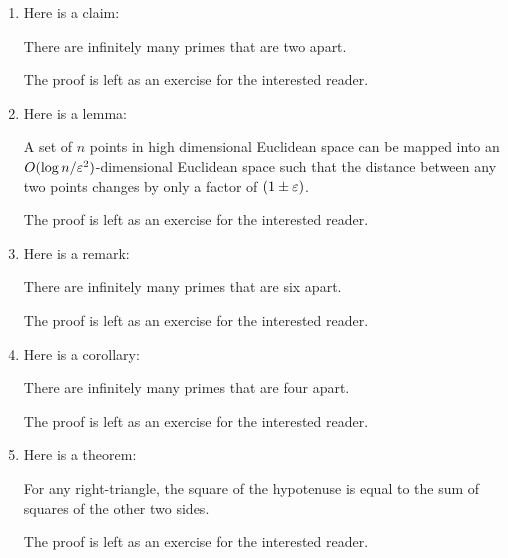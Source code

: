\documentclass{article}
\begin{document}
\fontin
{}
\begin{enumerate}
  [
    leftmargin={*},
    label={\arabic*.},
    font={\bf\fontin},
    labelsep={10pt},
    itemsep={20pt},
    ref={\arabic*}
  ]
  \item \label{qst:1}
    Here is a claim:
    \begin{claim}\label{clm:1}
      There are infinitely many primes that are two apart.
    \end{claim}
    \begin{proof*}
      The proof is left as an exercise for the interested reader.
    \end{proof*}

  \item \label{qst:2}
    Here is a lemma:
    \begin{lemma}\label{lma:1}
      A set of $n$ points in high dimensional Euclidean space can
      be mapped into an $O(\log n/\varepsilon^2)$-dimensional Euclidean
      space such that the distance between any two points changes
      by only a factor of $(1 \pm \varepsilon)$.
    \end{lemma}
    \begin{proof*}
      The proof is left as an exercise for the interested reader.
    \end{proof*}

  \item \label{qst:3}
    Here is a remark:
    \begin{remark}\label{rem:1}
      There are infinitely many primes that are six apart.
    \end{remark}
    \begin{proof*}
      The proof is left as an exercise for the interested reader.
    \end{proof*}
  
  \item \label{qst:4}
    Here is a corollary:
    \begin{corollary}\label{cor:1}
      There are infinitely many primes that are four apart.
    \end{corollary}
    \begin{proof*}
      The proof is left as an exercise for the interested reader.
    \end{proof*}

  \item \label{qst:5}
    Here is a theorem:
    \begin{theorem}\label{thm:1}
      For any right-triangle, the square of the hypotenuse is equal
      to the sum of squares of the other two sides.
    \end{theorem}
    \begin{proof*}
      The proof is left as an exercise for the interested reader.
    \end{proof*}


\end{enumerate}
\end{document}
